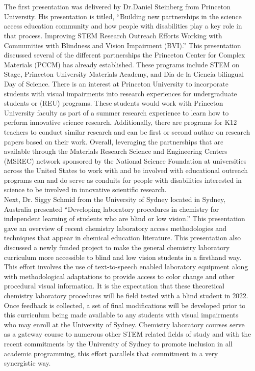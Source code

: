 \documentclass[11pt]{sig-alternate}
\begin{document}
\section*{\vspace{140mm}}
\begin{large}
The first presentation was delivered by Dr.Daniel Steinberg from Princeton University. His presentation is titled, “Building new partnerships in the science access education community and how people with disabilities play a key role in that process. Improving STEM Research Outreach Efforts Working with Communities with Blindness and Vision Impairment (BVI).” This presentation discussed several of the different partnerships the Princeton Center for Complex Materials (PCCM) has already established. The\-se programs include STEM on Stage, Princeton University Materials Academy, and Dia de la Ciencia bilingual Day of Science. There is an interest at Princeton University to incorporate students with visual impairments into research experiences for undergraduate students or (REU) programs. These students would work with Princeton University faculty as part of a summer research experience to learn how to perform innovative science research. Additionally, there are programs for K12 teachers to conduct similar research and can be first or second author on research papers based on their work. Overall, leveraging the partnerships that are available through the Materials Research Science and Engineering Centers (MSREC) network sponsored by the National Science Foundation at universities across the United States to work with and be involved with educational outreach programs can and do serve as conduits for people with disabilities interested in science to be involved in innovative scientific research.\\

Next, Dr. Siggy Schmid from the University of Sydney located in Sydney, Australia presented “Developing laboratory procedures in che\-mistry for independent learning of students who are blind or low vision.” This presentation gave an overview of recent chemistry laboratory access methodologies and techniques that appear in chemical education literature. This presentation also discussed a newly funded project to make the general chemistry laboratory curriculum more accessible to blind and low vision students in a firsthand way. This effort involves the use of text-to-speech enabled laboratory equipment along with methodological adaptations to provide access to color change and other procedural visual information. It is the expectation that these theoretical chemistry laboratory procedures will be field tested with a blind student in 2022. Once feedback is collected, a set of final modifications will be developed prior to this curriculum being made available to any students with visual impairments who may enroll at the University of Sydney. Chemistry laboratory courses serve as a gateway course to numerous other STEM related fields of study and with the recent commitments by the University of Sydney to promote inclusion in all academic programming, this effort parallels that commitment in a very synergistic way.\\


\end{large}
\end{document}
